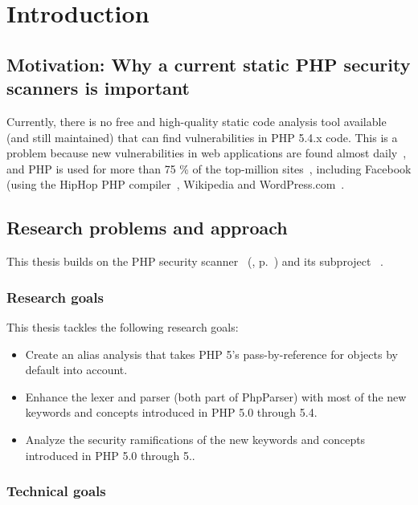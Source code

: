\chapter{Introduction}

\section{Motivation: Why a current static PHP security scanners is important}

Currently, there is no free and high-quality static code analysis tool available (and still maintained) that can find vulnerabilities in PHP 5.4.x code. This is a problem because new vulnerabilities in web applications are found almost daily~\cite{osvdb}, and PHP is used for more than 75 \% of the top-million sites~\cite{w3techs-php-usage}, including Facebook (using the HipHop PHP compiler~\cite{hiphop}, Wikipedia and WordPress.com~\cite{w3techs-php-sites}.

\section{Research problems and approach}

This thesis builds on the PHP security scanner ~(\cite{pixy}, p.~\pageref{pixy}) and its subproject ~\cite{phpparser}.

\subsection{Research goals}

This thesis tackles the following research goals:

\begin{itemize}
 \item Create an alias analysis that takes PHP 5's pass-by-reference for objects by default into account.
 \item Enhance the lexer and parser (both part of PhpParser) with most of the new keywords and concepts introduced in PHP 5.0 through 5.4.
 \item Analyze the security ramifications of the new keywords and concepts introduced in PHP 5.0 through 5..
\end{itemize}

\subsection{Technical goals}

